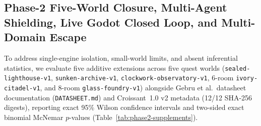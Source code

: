 \subsection{Phase-2 Five-World Closure, Multi-Agent Shielding, Live Godot Closed Loop, and Multi-Domain Escape}\label{sec:phase2-supplements}
To address single-engine isolation, small-world limits, and absent inferential statistics, we evaluate five additive extensions across five quest worlds (\texttt{sealed-\allowbreak lighthouse-\allowbreak v1}, \texttt{sunken-\allowbreak archive-\allowbreak v1}, \texttt{clockwork-\allowbreak observatory-\allowbreak v1}, 6-room \texttt{ivory-\allowbreak citadel-\allowbreak v1}, and 8-room \texttt{glass-\allowbreak foundry-\allowbreak v1}) alongside Gebru et al.\ datasheet documentation (\texttt{DATASHEET.md}) and Croissant~1.0 v2 metadata (12/12 SHA-256 digests), reporting exact 95\% Wilson confidence intervals and two-sided exact binomial McNemar $p$-values (Table~\ref{tab:phase2-supplements}).

